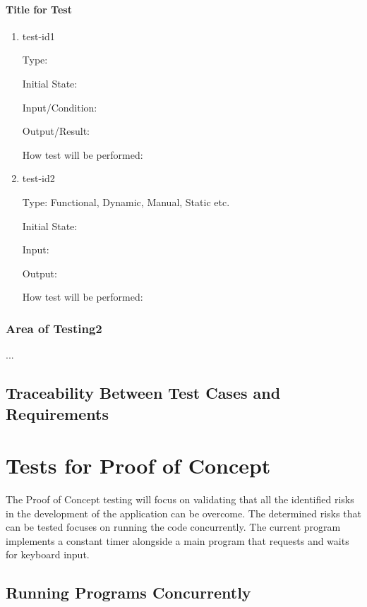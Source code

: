 \documentclass[12pt, titlepage]{article}
\begin{document}
\paragraph{Title for Test}

\begin{enumerate}

\item{test-id1\\}

Type: 
					
Initial State: 
					
Input/Condition: 
					
Output/Result: 
					
How test will be performed: 
					
\item{test-id2\\}

Type: Functional, Dynamic, Manual, Static etc.
					
Initial State: 
					
Input: 
					
Output: 
					
How test will be performed: 

\end{enumerate}

\subsubsection{Area of Testing2}

...

\subsection{Traceability Between Test Cases and Requirements}

\section{Tests for Proof of Concept}

The Proof of Concept testing will focus on validating that all the identified risks in the development of the application can be overcome. The determined risks that can be tested focuses on running the code concurrently. The current program implements a constant timer alongside a main program that requests and waits for keyboard input. 

\subsection{Running Programs Concurrently}
		
\end{document}
